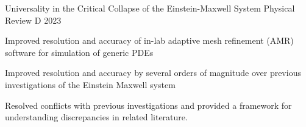 
\begin{cventries}
    
    
    \cventrythree
    {Universality in the Critical Collapse of the Einstein-Maxwell System} %
    {} %
    {Physical Review D} %
    {2023} %
    {\begin{cvitems} %
        \item Improved resolution and accuracy of in-lab adaptive mesh refinement (AMR) software for simulation of generic PDEs
        \item Improved resolution and accuracy by several orders of magnitude over previous investigations of the Einstein Maxwell system
        \item Resolved conflicts with previous investigations and provided a framework for understanding discrepancies in related literature.
    \end{cvitems}}


\end{cventries}
